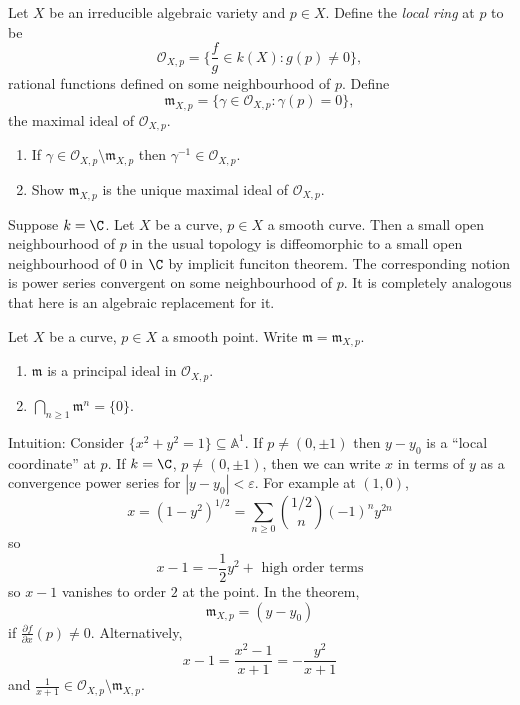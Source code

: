 \documentclass[a4paper]{article}
\renewcommand{\A}{\mathbb{A}}
\begin{document}
\begin{definition}
  Let \(X\) be an irreducible algebraic variety and \(p \in X\). Define the \emph{local ring} at \(p\) to be
  \[
    \mathcal O_{X, p} = \{\frac{f}{g} \in k(X): g(p) \neq 0\},
  \]
  rational functions defined on some neighbourhood of \(p\). Define
  \[
    \mathfrak m_{X, p} = \{\gamma \in \mathcal O_{X, p}: \gamma(p) = 0\},
  \]
  the maximal ideal of \(\mathcal O_{X, p}\).
\end{definition}

\begin{ex}\leavevmode
  \begin{enumerate}
  \item If \(\gamma \in \mathcal O_{X, p} \setminus \mathfrak m_{X, p}\) then \(\gamma^{-1} \in \mathcal O_{X, p}\).
  \item Show \(\mathfrak m_{X, p}\) is the unique maximal ideal of \(\mathcal O_{X, p}\).
  \end{enumerate}
\end{ex}

Suppose \(k = \C\). Let \(X\) be a curve, \(p \in X\) a smooth curve. Then a small open neighbourhood of \(p\) in the usual topology is diffeomorphic to a small open neighbourhood of \(0\) in \(\C\) by implicit funciton theorem. The corresponding notion is power series convergent on some neighbourhood of \(p\). It is completely analogous that here is an algebraic replacement for it.

\begin{theorem}
  Let \(X\) be a curve, \(p \in X\) a smooth point. Write \(\mathfrak m = \mathfrak m_{X, p}\).
  \begin{enumerate}
  \item \(\mathfrak m\) is a principal ideal in \(\mathcal O_{X, p}\).
  \item \(\bigcap_{n \geq 1} \mathfrak m^n = \{0\}\).
  \end{enumerate}
\end{theorem}

\begin{eg}
  Intuition: Consider \(\{x^2 + y^2 = 1\} \subseteq \A^1\). If \(p \neq (0, \pm 1)\) then \(y - y_0\) is a ``local coordinate'' at \(p\). If \(k = \C\), \(p \neq (0, \pm 1)\), then we can write \(x\) in terms of \(y\) as a convergence power series for \(|y - y_0| < \varepsilon\). For example at \((1, 0)\),
  \[
    x
    = (1 - y^2)^{1/2}
    = \sum_{n \geq 0} \binom{1/2}{n} (-1)^n y^{2n}
  \]
  so
  \[
    x - 1 = -\frac{1}{2}y^2 + \text{ high order terms}
  \]
  so \(x - 1\) vanishes to order \(2\) at the point. In the theorem,
  \[
    \mathfrak m_{X, p} = (y - y_0)
  \]
  if \(\frac{\partial f}{\partial x}(p) \neq 0\). Alternatively,
  \[
    x - 1
    = \frac{x^2 - 1}{x + 1}
    = -\frac{y^2}{x + 1}
  \]
  and \(\frac{1}{x + 1} \in \mathcal O_{X, p} \setminus \mathfrak m_{X, p}\).
\end{eg}
\end{document}
